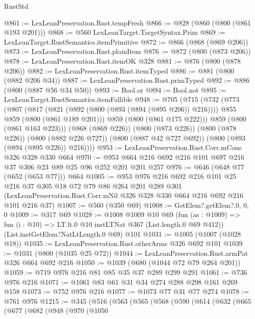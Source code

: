 \begin{lexlean}{RustStd}
\begin{coremodule}
@861 := LexLeanPreservation.Rust.tempFresh
@866 := @828 (@860 (@800 (@861 @193 @201)))
@868 := @560 LexLeanTarget.TargetSyntax.Prim
@869 := LexLeanTarget.RustSemantics.itemPrimitive
@872 := @866 (@868 (@869 @206))
@873 := LexLeanPreservation.Rust.plainItem
@876 := @872 (@800 (@873 @206))
@878 := LexLeanPreservation.Rust.itemOK @328
@881 := @876 (@800 (@878 @206))
@882 := LexLeanPreservation.Rust.itemTyped
@886 := @881 (@800 (@882 @206 @34))
@887 := LexLeanPreservation.Rust.primTyped
@892 := @886 (@800 (@887 @56 @34 @50))
@893 := Bool.or
@894 := Bool.not
@895 := LexLeanTarget.RustSemantics.itemFallible
@948 := @705
    (@715
      (@732
        (@773
          (@807
            (@817
              (@821 (@892 (@800 (@893 (@894 (@895 @206)) @216))))
              @855
              @859
              (@800 (@861 @189 @201)))
            @859
            (@800 (@861 @175 @222)))
          @859
          (@800 (@861 @163 @223)))
        (@868 (@869 @226))
        (@800 (@873 @226))
        (@800 (@878 @226))
        (@800 (@882 @226 @727))
        (@800 (@887 @42 @727 @692))
        (@800 (@893 (@894 (@895 @226)) @216))))
@953 := LexLeanPreservation.Rust.Corr.mCons @326 @328 @330 @664
@970 := @953 @664 @216 @692 @216 @101 @697 @216 @37 @306 @23 @89 @25 @96 @252 @201 @201 @257
@976 := @646 (@648 @77 (@652 (@653 @77))) @664
@1005 := @953
    @976
    @216
    @692
    @216
    @101
    @25
    @216
    @37
    @305
    @18
    @72
    @79
    @86
    @264
    @201
    @289
    @301
    (LexLeanPreservation.Rust.Corr.mNil @326 @328 @330 @664 @216 @692 @216 @101 @216 @37)
@1007 := @560 (@350 @69)
@1008 := GetElem?.getElem?.{0, 0, 0}
@1009 := @317 @69
@1028 := @1008
    @1009
    @10
    @69
    (fun (as : @1009) => fun (i : @10) => LT.lt.{0} @10 instLTNat @367 (List.length.{0} @69 @412))
    (List.instGetElem?NatLtLength.{0} @69)
    @101
@1031 := @1005 (@1007 (@1028 @18))
@1035 := LexLeanPreservation.Rust.otherArms @326 @692 @101
@1039 := @1031 (@800 (@1035 @25 @72))
@1044 := LexLeanPreservation.Rust.armPat @326 @664 @692 @216
@1050 := @1039 (@680 (@1044 @72 @79 @264 @201))
@1059 := @719 @976 @216 @81 @85 @35 @37 @289 @299 @291
@1061 := @736 @976 @216
@1071 := @1061 @83 @61 @31 @34 @274 @288 @298 @161 @269 @158
@1073 := @752 @976 @216
@1077 := @1073 @77 @31 @77 @274
@1078 := @761 @976
@1215 := @345
    (@516
      (@563
        (@565
          (@568
            (@590
              (@614
                (@632
                  (@665
                    (@677
                      (@682
                        (@948
                          (@970
                            (@1050

\end{coremodule}
\end{lexlean}
